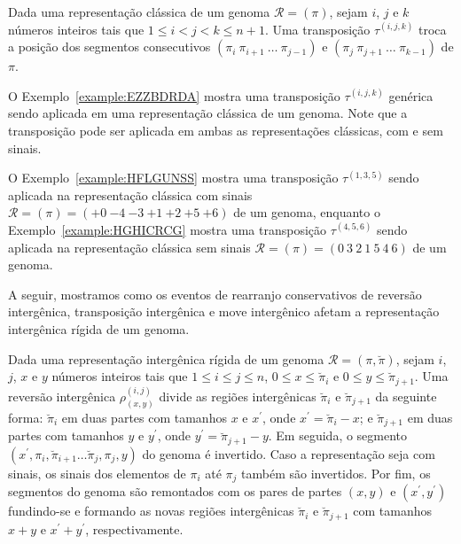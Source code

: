 



\begin{definition}
Dada uma representação clássica de um genoma $\mathcal{R} = (\pi)$, sejam $i$, $j$ e $k$ números inteiros tais que $1 \le i < j < k \le n + 1$. Uma transposição $\tau^{(i,j,k)}$ troca a posição dos segmentos consecutivos $(\pi_i~\pi_{i+1}~\dots~\pi_{j-1})$ e $(\pi_j~\pi_{j+1}~\dots~\pi_{k-1})$ de $\pi$.
\end{definition}

O Exemplo~\ref{example:EZZBDRDA} mostra uma transposição $\tau^{(i,j,k)}$ genérica sendo aplicada em uma representação clássica de um genoma. Note que a transposição pode ser aplicada em ambas as representações clássicas, com e sem sinais.



O Exemplo~\ref{example:HFLGUNSS} mostra uma transposição $\tau^{(1,3,5)}$ sendo aplicada na representação clássica com sinais $\mathcal{R} = (\pi) = ({+0}~{-4}~{-3}~{+1}~{+2}~{+5}~{+6})$ de um genoma, enquanto o Exemplo~\ref{example:HGHICRCG} mostra uma transposição $\tau^{(4,5,6)}$ sendo aplicada na representação clássica sem sinais $\mathcal{R} = (\pi) = ({0}~{3}~{2}~{1}~{5}~{4}~{6})$ de um genoma.





A seguir, mostramos como os eventos de rearranjo conservativos de reversão intergênica, transposição intergênica e move intergênico afetam a representação intergênica rígida de um genoma. 

\begin{definition}
Dada uma representação intergênica rígida de um genoma $\mathcal{R} = (\pi,\breve\pi)$, sejam $i$, $j$, $x$ e $y$ números inteiros tais que $1 \le i \le j \le n$, $0 \le x \le \breve\pi_i$ e $0 \le y \le \breve\pi_{j+1}$. Uma reversão intergênica $\rho^{(i, j)}_{(x, y)}$ divide as regiões intergênicas $\breve\pi_i$ e $\breve\pi_{j+1}$ da seguinte forma: $\breve\pi_i$ em duas partes com tamanhos $x$ e $x^{\prime}$, onde $x^{\prime}=\breve\pi_i-x$; e $\breve\pi_{j+1}$ em duas partes com tamanhos $y$ e $y^{\prime}$, onde $y^{\prime}=\breve\pi_{j+1}-y$. Em seguida, o segmento $(x^{\prime},\pi_i,\breve\pi_{i+1}\dots\breve\pi_j,\pi_j,y)$ do genoma é invertido. Caso a representação seja com sinais, os sinais dos elementos de $\pi_i$ até $\pi_{j}$ também são invertidos. Por fim, os segmentos do genoma são remontados com os pares de partes $(x,y)$ e $(x^{\prime},y^{\prime})$ fundindo-se e formando as novas regiões intergênicas $\breve\pi_i$ e $\breve\pi_{j+1}$ com tamanhos $x + y$ e $x^{\prime}+y^{\prime}$, respectivamente.
\end{definition}

